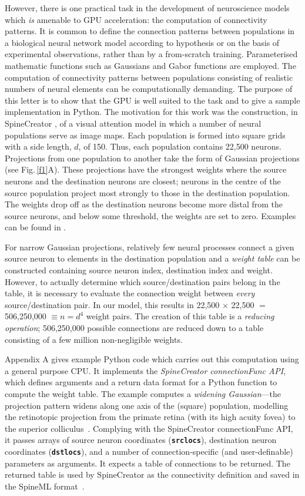 \documentclass[12pt, a4paper]{article}
\newcommand{\code}[1]{\textbf{\texttt{#1}}}
\begin{document}
However, there is one practical task in the development of neuroscience models
which \emph{is} amenable to GPU acceleration: the computation of connectivity
patterns. It is common to define the connection patterns between populations
in a biological neural network model according to hypothesis or on the basis
of experimental observations, rather than by a from-scratch
training. Parameterised mathematic functions such as Gaussians and Gabor
functions are employed. The computation of connectivity patterns between
populations consisting of realistic numbers of neural elements can be
computationally demanding. The purpose of this letter is to show that the GPU
is well suited to the task and to give a sample implementation in Python. The
motivation for this work was the construction, in
SpineCreator \cite{cope_spinecreator_2015,cope_spinecreator:_2016}, of a
visual attention model in which a number of neural populations serve as image
maps. Each population is formed into square grids with a side length, $d$, of
150. Thus, each population contains 22,500 neurons. Projections from one
population to another take the form of Gaussian projections (see
Fig.\,\ref{f1}A). These projections have the strongest weights where the
source neurons and the destination neurons are closest; neurons in the centre
of the source population project most strongly to those in the destination
population. The weights drop off as the destination neurons become more distal
from the source neurons, and below some threshold, the weights are set to
zero. Examples can be found in \cite{james_integrating_2018}.

For narrow Gaussian projections, relatively few neural processes connect a
given source neuron to elements in the destination population and
a \emph{weight table} can be constructed containing source neuron index,
destination index and weight. However, to actually determine which
source/destination pairs belong in the table, it is necessary to evaluate the
connection weight between \emph{every} source/destination pair. In our model,
this results in 22,500 $\times$ 22,500 $=$ 506,250,000 $\equiv n = d^4$ weight
pairs.  The creation of this table is a \emph{reducing operation}; 506,250,000
possible connections are reduced down to a table consisting of a few
million non-negligible weights.

Appendix A gives example Python code which carries out this computation using
a general purpose CPU. It implements the \emph{SpineCreator connectionFunc
API}, which defines arguments and a return data format for a Python function
to compute the weight table. The example computes a \emph{widening
Gaussian}---the projection pattern widens along one axis of the (square)
population, modelling the retinotopic projection from the primate retina (with
its high acuity fovea) to the superior
colliculus~\cite{james_integrating_2018}. Complying with the SpineCreator
connectionFunc API, it passes arrays of source neuron coordinates
(\code{srclocs}), destination neuron coordinates (\code{dstlocs}), and a
number of connection-specific (and user-definable) parameters as arguments. It
expects a table of connections to be returned. The returned table is used by
SpineCreator as the connectivity definition and saved in the SpineML
format~\cite{cope_spineml_2014}.
\end{document}
